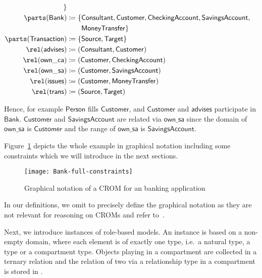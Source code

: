 \begin{example}
\begin{align*}
             \} \\
    \parts(\mathsf{Bank}) & \coloneqq \{\mathsf{Consultant}, \mathsf{Customer},
                             \mathsf{CheckingAccount}, \mathsf{SavingsAccount},\\
           & \phantom{{} \coloneqq \{} \mathsf{MoneyTransfer}\}\\
    \parts(\mathsf{Transaction}) & \coloneqq \{\mathsf{Source},  \mathsf{Target}\}\\
    \rel(\mathsf{advises}) & \coloneqq (\mathsf{Consultant}, \mathsf{Customer}) \\
    \rel(\mathsf{own\_ca}) & \coloneqq (\mathsf{Customer}, \mathsf{CheckingAccount}) \\
    \rel(\mathsf{own\_sa}) & \coloneqq (\mathsf{Customer}, \mathsf{SavingsAccount}) \\
    \rel(\mathsf{issues}) & \coloneqq (\mathsf{Customer}, \mathsf{MoneyTransfer}) \\
    \rel(\mathsf{trans}) & \coloneqq (\mathsf{Source}, \mathsf{Target})
  \end{align*}
   
  Hence, for example $\mathsf{Person}$ fills $\mathsf{Customer}$, and $\mathsf{Customer}$ and
  $\mathsf{advises}$ participate in $\mathsf{Bank}$. $\mathsf{Customer}$ and $\mathsf{SavingsAccount}$
  are related via $\mathsf{own\_sa}$ since the domain of $\mathsf{own\_sa}$ is $\mathsf{Customer}$
  and the range of $\mathsf{own\_sa}$ is $\mathsf{SavingsAccount}$.


  Figure~\ref{fig:bank} depicts the whole example in graphical notation including some constraints
  which we will introduce in the next sections.
\end{example}

\begin{figure}
  \centering
  \texttt{[image: Bank-full-constraints]}
  \caption{Graphical notation of a CROM for an banking application}
  \label{fig:bank}
\end{figure}

In our definitions, we omit to precisely define the graphical notation as they are not relevant for
reasoning on CROMs and refer to~\cite{KBG-SLE15}.

Next, we introduce instances of role-based models. An instance is based on a non-empty domain,
where each element is of exactly one type, i.e.\ a natural type, a \rosirole type or a compartment
type. Objects playing \rosirole in a compartment are collected in a ternary relation \plays and the
relation of two \rosiroles via a relationship type in a compartment is stored in \links.


